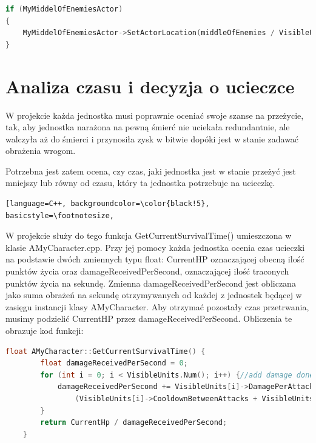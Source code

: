 \documentclass[12pt]{report}
\begin{document}
\begin{lstlisting}[language=C++, backgroundcolor=\color{black!5}, basicstyle=\footnotesize, caption=Ustawienie pozycji komponentu MyMiddelOfEnemiesActor w funkcji GetMiddleOfEnemies();]
if (MyMiddelOfEnemiesActor)
{
	MyMiddelOfEnemiesActor->SetActorLocation(middleOfEnemies / VisibleUnits.Num());
}
\end{lstlisting}

\section{Analiza czasu i decyzja o ucieczce}
W projekcie każda jednostka musi poprawnie oceniać swoje szanse na przeżycie, tak, aby jednostka narażona na pewną śmierć nie uciekała redundantnie, ale walczyła aż do śmierci i przynosiła zysk w bitwie dopóki jest w stanie zadawać obrażenia wrogom.

Potrzebna jest zatem ocena, czy czas, jaki jednostka jest w stanie przeżyć jest mniejszy lub równy od czasu, który ta jednostka potrzebuje na ucieczkę.

\begin{lstlisting}[language=C++, backgroundcolor=\color{black!5}, basicstyle=\footnotesize, 

\end{lstlisting}


W projekcie służy do tego funkcja GetCurrentSurvivalTime() umieszczona w klasie AMyCharacter.cpp. Przy jej pomocy każda jednostka ocenia czas ucieczki na podstawie dwóch zmiennych typu float: CurrentHP oznaczającej obecną ilość punktów życia oraz damageReceivedPerSecond, oznaczającej ilość traconych punktów życia na sekundę. Zmienna damageReceivedPerSecond jest obliczana jako suma obrażeń na sekundę otrzymywanych od każdej z jednostek będącej w zasięgu instancji klasy AMyCharacter. Aby otrzymać pozostały czas przetrwania, musimy podzielić CurrentHP przez damageReceivedPerSecond. Obliczenia te obrazuje kod funkcji:

\begin{lstlisting}[language=C++, backgroundcolor=\color{black!5}, basicstyle=\footnotesize, caption=Funkcja GetCurrentSurvivalTime w klasie AMyCharacter.cpp.]
    float AMyCharacter::GetCurrentSurvivalTime() {
		float damageReceivedPerSecond = 0;
		for (int i = 0; i < VisibleUnits.Num(); i++) {//add damage done by single unit to sum, all given values are in seconds
			damageReceivedPerSecond += VisibleUnits[i]->DamagePerAttack /
				(VisibleUnits[i]->CooldownBetweenAttacks + VisibleUnits[i]->AttackDuration);
		}
		return CurrentHp / damageReceivedPerSecond;
	}
\end{lstlisting}
\end{document}
